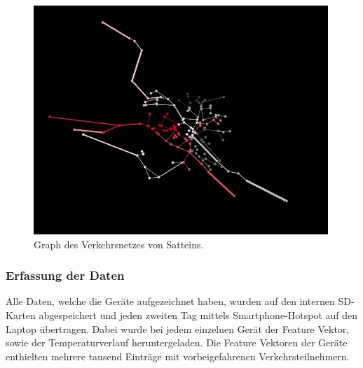 \begin{figure}[H]
  \centering
  \includegraphics[width=0.99\textwidth]{Resultate/Topologie.jpg} 
  \caption{Graph des Verkehrsnetzes von Satteins.}
  \label{bGraph}
\end{figure}

\subsubsection{Erfassung der Daten}
Alle Daten, welche die Geräte aufgezeichnet haben, wurden auf den internen SD-Karten abgespeichert und jeden zweiten Tag mittels Smartphone-Hotspot auf den Laptop übertragen. Dabei wurde bei jedem einzelnen Gerät der Feature Vektor, sowie der Temperaturverlauf heruntergeladen. Die Feature Vektoren der Geräte enthielten mehrere tausend Einträge mit vorbeigefahrenen Verkehrsteilnehmern.